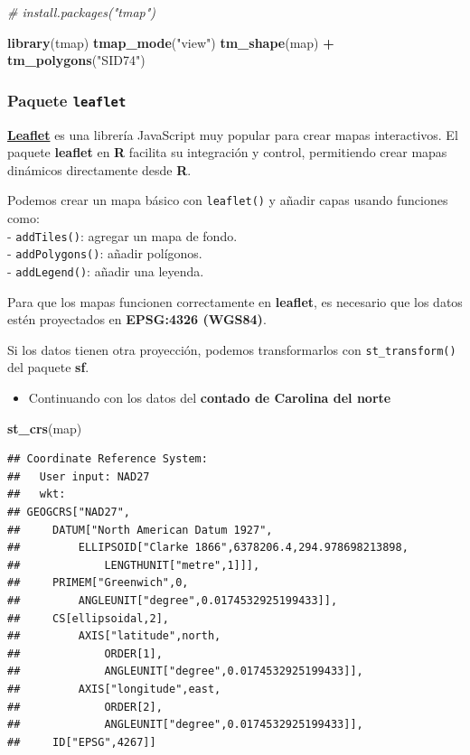 \documentclass[
]{book}
\newenvironment{Shaded}{\begin{snugshade}}{\end{snugshade}}
\newcommand{\CommentTok}[1]{\textcolor[rgb]{0.56,0.35,0.01}{\textit{#1}}}
\newcommand{\FunctionTok}[1]{\textcolor[rgb]{0.13,0.29,0.53}{\textbf{#1}}}
\newcommand{\NormalTok}[1]{#1}
\newcommand{\SpecialCharTok}[1]{\textcolor[rgb]{0.81,0.36,0.00}{\textbf{#1}}}
\newcommand{\StringTok}[1]{\textcolor[rgb]{0.31,0.60,0.02}{#1}}
\providecommand{\tightlist}{%
  \setlength{\itemsep}{0pt}\setlength{\parskip}{0pt}}
\begin{document}
\begin{Shaded}
\begin{Highlighting}[]
\CommentTok{\# install.packages("tmap")}

\FunctionTok{library}\NormalTok{(tmap)}
\FunctionTok{tmap\_mode}\NormalTok{(}\StringTok{"view"}\NormalTok{)}
\FunctionTok{tm\_shape}\NormalTok{(map) }\SpecialCharTok{+} 
  \FunctionTok{tm\_polygons}\NormalTok{(}\StringTok{"SID74"}\NormalTok{)}
\end{Highlighting}
\end{Shaded}

\subsubsection{\texorpdfstring{Paquete \texttt{leaflet}}{Paquete leaflet}}\label{paquete-leaflet}

\href{https://rstudio.github.io/leaflet/}{\textbf{Leaflet}} es una librería JavaScript muy popular para crear mapas interactivos. El paquete \textbf{leaflet} en \textbf{R} facilita su integración y control, permitiendo crear mapas dinámicos directamente desde \textbf{R}.

Podemos crear un mapa básico con \texttt{leaflet()} y añadir capas usando funciones como:\\
- \texttt{addTiles()}: agregar un mapa de fondo.\\
- \texttt{addPolygons()}: añadir polígonos.\\
- \texttt{addLegend()}: añadir una leyenda.

Para que los mapas funcionen correctamente en \textbf{leaflet}, es necesario que los datos estén proyectados en \textbf{EPSG:4326 (WGS84)}.

Si los datos tienen otra proyección, podemos transformarlos con \texttt{st\_transform()} del paquete \textbf{sf}.

\begin{itemize}
\tightlist
\item
  Continuando con los datos del \textbf{contado de Carolina del norte}
\end{itemize}

\begin{Shaded}
\begin{Highlighting}[]
\FunctionTok{st\_crs}\NormalTok{(map)}
\end{Highlighting}
\end{Shaded}

\begin{verbatim}
## Coordinate Reference System:
##   User input: NAD27 
##   wkt:
## GEOGCRS["NAD27",
##     DATUM["North American Datum 1927",
##         ELLIPSOID["Clarke 1866",6378206.4,294.978698213898,
##             LENGTHUNIT["metre",1]]],
##     PRIMEM["Greenwich",0,
##         ANGLEUNIT["degree",0.0174532925199433]],
##     CS[ellipsoidal,2],
##         AXIS["latitude",north,
##             ORDER[1],
##             ANGLEUNIT["degree",0.0174532925199433]],
##         AXIS["longitude",east,
##             ORDER[2],
##             ANGLEUNIT["degree",0.0174532925199433]],
##     ID["EPSG",4267]]
\end{verbatim}
\end{document}
